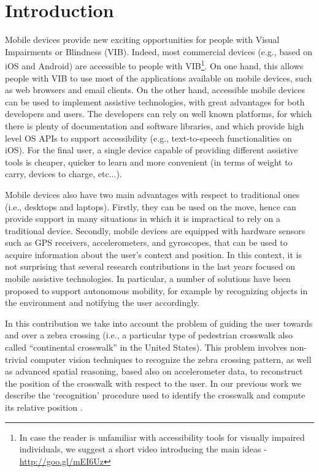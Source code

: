 \documentclass{article}
\begin{document}
\section{Introduction}
Mobile devices provide new exciting opportunities for people with Visual Impairments or Blindness (VIB).
Indeed, most commercial devices (e.g., based on iOS and Android) are accessible to people with VIB\footnote{In case the reader is unfamiliar with accessibility tools for visually impaired individuals, we suggest a  short video introducing the main ideas - \url{http://goo.gl/mEI6Uz}}.
On one hand, this allows people with VIB to use most of the applications available on mobile devices, such as web browsers and email clients. On the other hand, accessible mobile devices can be used to implement assistive technologies, with great advantages for both developers and users.
The developers can rely on well known platforms, for which there is plenty of documentation and software libraries, and which provide high level OS APIs to support accessibility (e.g., text-to-speech functionalities on iOS).
For the final user, a single device capable of providing different assistive tools is cheaper, quicker to learn and more convenient (in terms of weight to carry, devices to charge, etc...).

Mobile devices also have two main advantages with respect to traditional ones (i.e., desktops and laptops).
Firstly, they can be used on the move, hence can provide support in many situations in which it is impractical to rely on a traditional device.
Secondly, mobile devices are equipped with hardware sensors such as GPS receivers, accelerometers, and gyroscopes, that can be used to acquire information about the user's context and position.
In this context, it is not surprising that several research contributions in the last years focused on mobile assistive technologies.
In particular, a number of solutions have been proposed to support autonomous mobility, for example by recognizing objects in the environment and notifying the user accordingly.

In this contribution we take into account the problem of guiding the user towards and over a zebra crossing (i.e., a particular type of pedestrian crosswalk also called ``continental crosswalk'' in the United States).
This problem involves non-trivial computer vision techniques to recognize the zebra crossing pattern, as well as advanced spatial reasoning, based also on accelerometer data, to reconstruct the position of the crosswalk with respect to the user.
In our previous work we describe the `recognition' procedure used to identify the crosswalk and compute its relative position \cite{AhmetovicICPR2014}.
\end{document}
